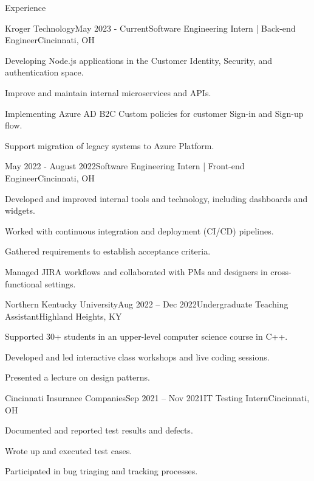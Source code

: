 \documentclass[11pt]{resume}
\begin{document}
\begin{rSection}{Experience}

	\begin{rSubsection}{Kroger Technology}{May 2023 - Current}{Software Engineering Intern | Back-end Engineer}{Cincinnati, OH}
        \item Developing Node.js applications in the Customer Identity, Security, and authentication space. 
        \item Improve and maintain internal microservices and APIs.
        \item Implementing Azure AD B2C Custom policies for customer Sign-in and Sign-up flow.
        \item Support migration of legacy systems to Azure Platform.
	\end{rSubsection}

    \begin{rSubsection}{}{May 2022 - August 2022}{Software Engineering Intern | Front-end Engineer}{Cincinnati, OH}
        \item Developed and improved internal tools and technology, including dashboards and widgets.
        \item Worked with continuous integration and deployment (CI/CD) pipelines.
        \item Gathered requirements to establish acceptance criteria.
        \item Managed JIRA workflows and collaborated with PMs and designers in cross-functional settings.
    \end{rSubsection}

    \begin{rSubsection}{Northern Kentucky University}{Aug 2022 – Dec 2022}{Undergraduate Teaching Assistant}{Highland Heights, KY}
        \item Supported 30+ students in an upper-level computer science course in C++.
        \item Developed and led interactive class workshops and live coding sessions.
        \item Presented a lecture on design patterns.
    \end{rSubsection}

    \begin{rSubsection}{Cincinnati Insurance Companies}{Sep 2021 – Nov 2021}{IT Testing Intern}{Cincinnati, OH}
        \item Documented and reported test results and defects.
        \item Wrote up and executed test cases.
        \item Participated in bug triaging and tracking processes.
    \end{rSubsection}
	
\end{rSection}
\end{document}
